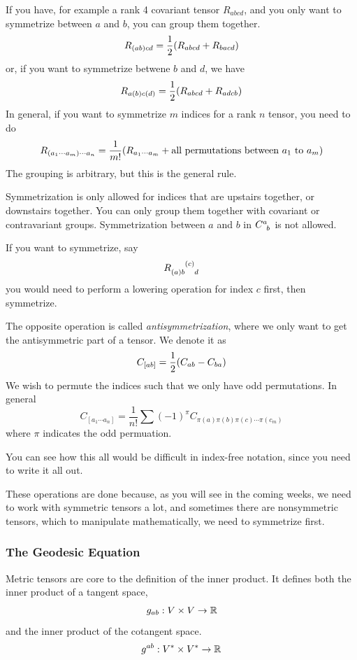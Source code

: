 		If you have, for example a rank 4 covariant tensor $R_{abcd}$, and you
		only want to symmetrize between $a$ and $b$, you can group them together.
		\[
			R_{(ab)cd} 
			=
			\frac{1}{2}
			\pqty{
				R_{abcd} +
				R_{bacd}
			}
		\]
		or, if you want to symmetrize betwene $b$ and $d$, we have
		\[
			R_{a(b)c(d)} 
			=
			\frac{1}{2}
			\pqty{
				R_{abcd} +
				R_{adcb}
			}
		\]
		In general, if you want to symmetrize $m$ indices for a rank $n$
		tensor, you need to do
		\[
			R_{(a_1\cdots a_m)\cdots a_n}
			=
			\frac{1}{m!}
			\pqty{
				R_{a_1\cdots a_m} +
				\text{all permutations between } a_1\text{ to }a_m
			}
		\]
		The grouping is arbitrary, but this is the general rule.

		Symmetrization is only allowed for indices that are upstairs together, or downstairs together.
		You can only group them together with covariant or contravariant groups.
		Symmetrization between $a$ and $b$ in $C\indices{^a_b}$ is not allowed.

		If you want to symmetrize, say
		\[
			R\indices{_{(a)b}^{(c)}_d}
		\]
		you would need to perform a lowering operation for index $c$ first, then symmetrize.

		The opposite operation is called \textit{antisymmetrization}, where 
		we only want to get the antisymmetric part of a tensor. We denote it as
		\[
			C_{[ab]} = \frac{1}{2}\pqty{
				C_{ab} - C_{ba}
			} 
		\]
		We wish to permute the indices such that we only have odd permutations.
		In general
		\[
			C_{[a_1\cdots a_n]}
			=
			\frac{1}{n!}
			\sum (-1)^\pi
			C_{\pi (a)\pi (b)\pi (c)\cdots \pi (c_m)}
		\]
		where $\pi$ indicates the odd permuation.
		
		You can see how this all would be difficult in index-free notation,
		since you need to write it all out. 

		These operations are done because, as you will see in the coming weeks, we need
		to work with symmetric tensors a lot, and sometimes there are nonsymmetric tensors,
		which to manipulate mathematically, we need to symmetrize first.
		\newpage
\subsubsection{The Geodesic Equation}
	
	Metric tensors are core to the definition of the inner product.
	It defines both the inner product of a tangent space,
	\[
		g_{ab}: V\times V\to \mathbb{R}
	\]
	and the inner product of the cotangent space.
	\[
		g^{ab}: V^*\times V^* \to \mathbb{R}
	\]

